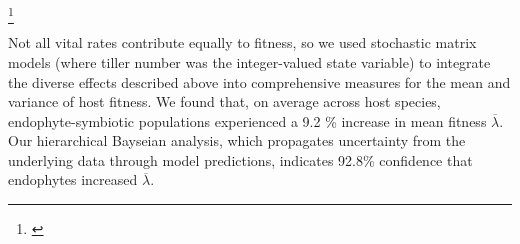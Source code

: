 \documentclass[12pt]{article}
\newcommand{\tom}[2]{{\color{red}{#1}}\footnote{\textit{\color{red}{#2}}}}
\begin{document}
 
 
 



\tom{ Additionally, the effect of mutualism increases under simulations with increased variance driven by greater contributions of variance buffering. In the most extreme scenario, we find that variance buffering contributions across species are 1.5 times greater than effects on the mean on average, and that variance buffering contributions are greater than mean effects for five out of seven species.}{I would eliminate this paragraph entirely. Not needed, since you launch directly into results from here.}


Not all vital rates contribute equally to fitness, so we used stochastic matrix models (where tiller number was the integer-valued state variable) to integrate the diverse effects described above into comprehensive measures for the mean and variance of host fitness.
We found that, on average across host species, endophyte-symbiotic populations experienced a 9.2 \% increase in mean fitness $\overline{\lambda}$. 
Our hierarchical Bayseian analysis, which propagates uncertainty from the underlying data through model predictions, indicates 92.8\% confidence that endophytes increased $\overline{\lambda}$.
\end{document}
